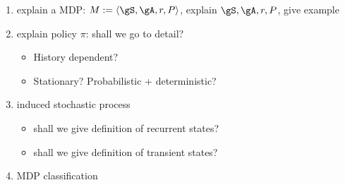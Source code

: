 \begin{enumerate}
    \item explain a MDP: $M:=\langle\gS, \gA, r, P\rangle$, explain $\gS, \gA, r, P$, give example
    \item explain policy $\pi$: shall we go to detail?
        \begin{itemize}
            \item History dependent?
            \item Stationary? Probabilistic + deterministic?
        \end{itemize}
    \item induced stochastic process
        \begin{itemize}
            \item shall we give definition of recurrent states?
            \item shall we give definition of transient states?
        \end{itemize}
    \item MDP classification
\end{enumerate}

